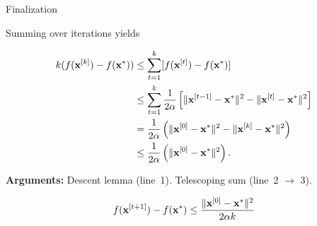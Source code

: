 \documentclass[11pt,compress,t,notes=noshow, xcolor=table]{beamer}
\begin{document}
\begin{vbframe}{Finalization}

Summing over iterations yields

\vspace*{-1.5\baselineskip}

\begin{align*}
    k ( f(\mathbf{x}^{[k]}) - f(\mathbf{x}^\ast)) &\leq \sum_{t=1}^{k} [f(\mathbf{x}^{[t]}) - f(\mathbf{x}^\ast)]\\
    &\leq \sum_{t=1}^{k} \frac{1}{2 \alpha} \left[ \|\mathbf{x}^{[t-1]}-\mathbf{x}^\ast\|^2 - \| \mathbf{x}^{[t]} - \mathbf{x}^\ast \|^2 \right] \\
    &= \frac{1}{2 \alpha}  \left( \|\mathbf{x}^{[0]}-\mathbf{x}^\ast\|^2 - \| \mathbf{x}^{[k]} - \mathbf{x}^\ast \|^2 \right) \\
    &\leq \frac{1}{2 \alpha} \left( \|\mathbf{x}^{[0]}-\mathbf{x}^\ast\|^2 \right).
\end{align*}

\textbf{Arguments:} Descent lemma (line~1).
Telescoping sum (line~2 $\to$ 3).

\begin{framed}
    $$f(\mathbf{x}^{[t+1]}) - f(\mathbf{x}^\ast) \leq \frac{\| \mathbf{x}^{[0]} - \mathbf{x}^\ast \|^2}{2\alpha k}$$
\end{framed}

%		
    
\end{vbframe}	

\endlecture
\end{document}
